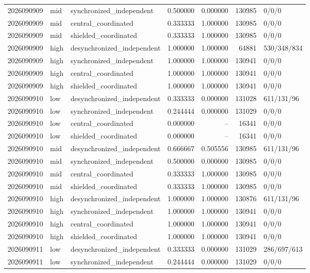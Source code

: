 \begin{longtable}{llp{38mm}rrrp{30mm}}
2026090909 & mid & synchronized\_independent & 0.500000 & 0.000000 & 130985 & 0/0/0 \\
2026090909 & mid & central\_coordinated & 0.333333 & 1.000000 & 130985 & 0/0/0 \\
2026090909 & mid & shielded\_coordinated & 0.333333 & 1.000000 & 130985 & 0/0/0 \\
2026090909 & high & desynchronized\_independent & 1.000000 & 1.000000 & 64881 & 530/348/834 \\
2026090909 & high & synchronized\_independent & 1.000000 & 1.000000 & 130941 & 0/0/0 \\
2026090909 & high & central\_coordinated & 1.000000 & 1.000000 & 130941 & 0/0/0 \\
2026090909 & high & shielded\_coordinated & 1.000000 & 1.000000 & 130941 & 0/0/0 \\
2026090910 & low & desynchronized\_independent & 0.333333 & 0.000000 & 131028 & 611/131/96 \\
2026090910 & low & synchronized\_independent & 0.244444 & 0.000000 & 131029 & 0/0/0 \\
2026090910 & low & central\_coordinated & 0.000000 & -- & 16341 & 0/0/0 \\
2026090910 & low & shielded\_coordinated & 0.000000 & -- & 16341 & 0/0/0 \\
2026090910 & mid & desynchronized\_independent & 0.666667 & 0.505556 & 130985 & 611/131/96 \\
2026090910 & mid & synchronized\_independent & 0.500000 & 0.000000 & 130985 & 0/0/0 \\
2026090910 & mid & central\_coordinated & 0.333333 & 1.000000 & 130985 & 0/0/0 \\
2026090910 & mid & shielded\_coordinated & 0.333333 & 1.000000 & 130985 & 0/0/0 \\
2026090910 & high & desynchronized\_independent & 1.000000 & 1.000000 & 130876 & 611/131/96 \\
2026090910 & high & synchronized\_independent & 1.000000 & 1.000000 & 130941 & 0/0/0 \\
2026090910 & high & central\_coordinated & 1.000000 & 1.000000 & 130941 & 0/0/0 \\
2026090910 & high & shielded\_coordinated & 1.000000 & 1.000000 & 130941 & 0/0/0 \\
2026090911 & low & desynchronized\_independent & 0.333333 & 0.000000 & 131029 & 286/697/613 \\
2026090911 & low & synchronized\_independent & 0.244444 & 0.000000 & 131029 & 0/0/0 \\

\end{longtable}
